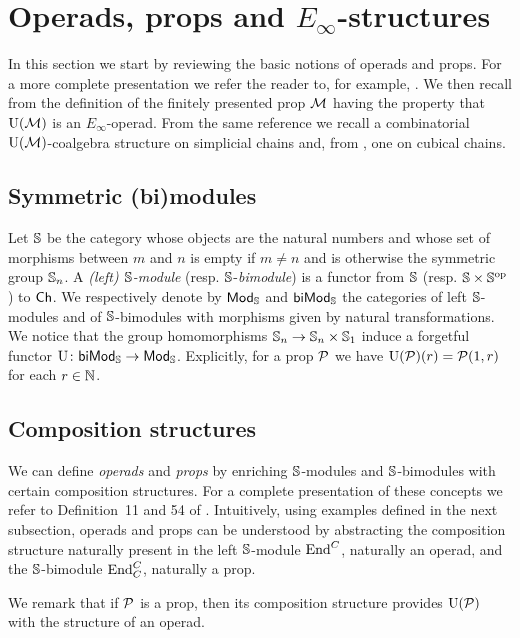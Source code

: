 
\section{Operads, props and \texorpdfstring{$E_\infty$}{E-infty}-structures} \label{s:operads and props}

In this section we start by reviewing the basic notions of operads and props.
For a more complete presentation we refer the reader to, for example, \cite{markl2008props}.
We then recall from \cite{medina2020prop1} the definition of the finitely presented prop $\M$ having the property that $\UM$ is an $E_{\infty}$-operad.
From the same reference we recall a combinatorial $\UM$-coalgebra structure on simplicial chains and, from \cite{medina2021cubical}, one on cubical chains.

\subsection{Symmetric (bi)modules}

Let $\S$ be the category whose objects are the natural numbers and whose set of morphisms between $m$ and $n$ is empty if $m \neq n$ and is otherwise the symmetric group $\S_n$.
A \textit{(left) $\S$-module} (resp. $\S$-\textit{bimodule}) is a functor from $\S$ (resp. $\S \times \S^\op$) to $\Ch$.
We respectively denote by $\smod$ and $\sbimod$ the categories of left $\S$-modules and of $\S$-bimodules with morphisms given by natural transformations.
We notice that the group homomorphisms $\S_n \to \S_n \times \S_1$ induce a forgetful functor $\U \colon \sbimod \to \smod$.
Explicitly, for a prop $\P$ we have $\U(\P)(r) = \P(1, r)$ for each $r \in \N$.

\subsection{Composition structures}

We can define \textit{operads} and \textit{props} by enriching $\S$-modules and $\S$-bimodules with certain composition structures.
For a complete presentation of these concepts we refer to Definition~11 and 54 of \cite{markl2008props}.
Intuitively, using examples defined in the next subsection, operads and props can be understood by abstracting the composition structure naturally present in the left $\S$-module $\End^C$, naturally an operad, and the $\S$-bimodule $\End^C_C$, naturally a prop.

We remark that if $\P$ is a prop, then its composition structure provides $\U(\P)$ with the structure of an operad.

